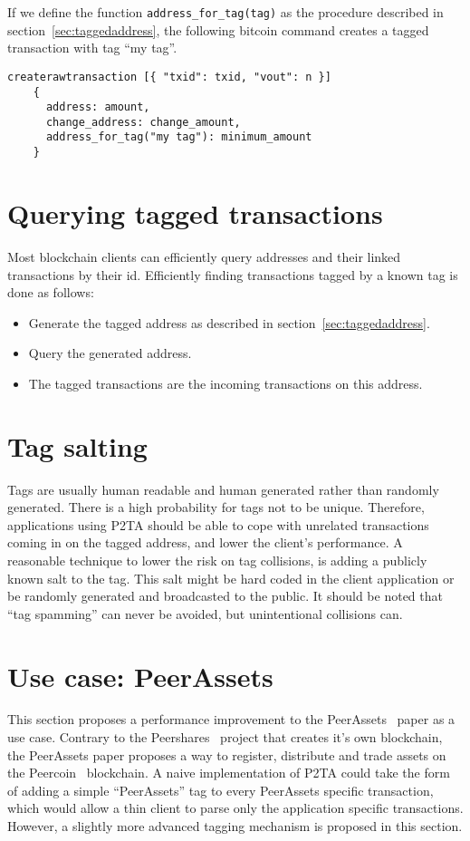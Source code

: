 \documentclass[a4paper,10pt]{article}
\begin{document}
If we define the function \verb|address_for_tag(tag)| as the procedure described in section~\ref{sec:taggedaddress}, the following bitcoin command creates a tagged transaction with tag ``my tag''.
\begin{verbatim}
createrawtransaction [{ "txid": txid, "vout": n }]
    {
      address: amount,
      change_address: change_amount,
      address_for_tag("my tag"): minimum_amount
    }
\end{verbatim}


\section{Querying tagged transactions}
Most blockchain clients can efficiently query addresses and their linked transactions by their id.
Efficiently finding transactions tagged by a known tag is done as follows:
\begin{itemize}
 \item Generate the tagged address as described in section~\ref{sec:taggedaddress}.
 \item Query the generated address.
 \item The tagged transactions are the incoming transactions on this address.
\end{itemize}


\section{Tag salting}
Tags are usually human readable and human generated rather than randomly generated.
There is a high probability for tags not to be unique.
Therefore, applications using P2TA should be able to cope with unrelated transactions coming in on the tagged address, and lower the client's performance.
A reasonable technique to lower the risk on tag collisions, is adding a publicly known salt to the tag.
This salt might be hard coded in the client application or be randomly generated and broadcasted to the public.
It should be noted that ``tag spamming'' can never be avoided, but unintentional collisions can.


\section{Use case: PeerAssets}
This section proposes a performance improvement to the PeerAssets~\cite{Pchem} paper as a use case.
Contrary to the Peershares~\cite{Lee13} project that creates it's own blockchain, the PeerAssets paper proposes a way to register, distribute and trade assets on the Peercoin~\cite{King12} blockchain.
A naive implementation of P2TA could take the form of adding a simple ``PeerAssets'' tag to every PeerAssets specific transaction, which would allow a thin client to parse only the application specific transactions.
However, a slightly more advanced tagging mechanism is proposed in this section.
\end{document}
